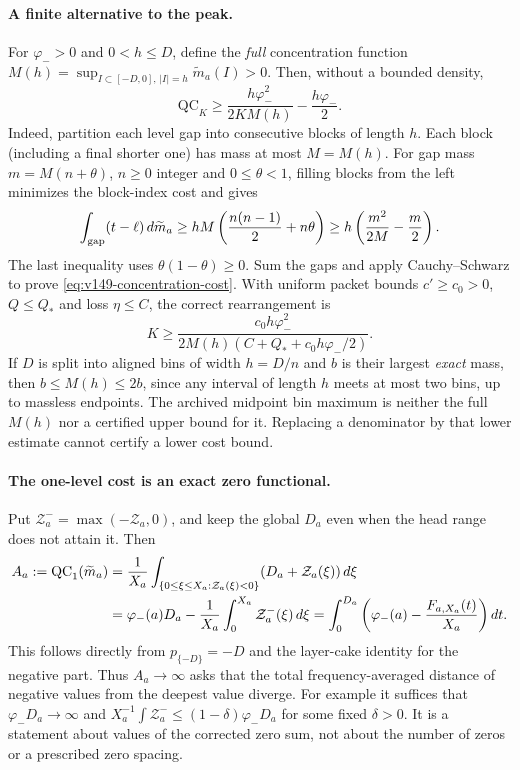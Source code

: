 \paragraph{A finite alternative to the peak.}
For $\varphi_->0$ and $0<h\le D$, define the \emph{full} concentration
function $M(h)=\sup_{I\subset[-D,0],\,|I|=h}\widetilde m_a(I)>0$.
Then, without a bounded density,
\begin{equation}\label{eq:v149-concentration-cost}
 \mathrm{QC}_K\ge\frac{h\varphi_-^2}{2KM(h)}-\frac{h\varphi_-}{2}.
\end{equation}
Indeed, partition each level gap into consecutive blocks of length $h$.
Each block (including a final shorter one) has mass at most $M=M(h)$.
For gap mass $m=M(n+\theta)$, $n\ge0$ integer and $0\le\theta<1$, filling
blocks from the left minimizes the block-index cost and gives
\[
 \int_{\rm gap}(t-\ell)\,d\widetilde m_a
 \ge hM\left(\frac{n(n-1)}2+n\theta\right)
 \ge h\left(\frac{m^2}{2M}-\frac m2\right).
\]
The last inequality uses $\theta(1-\theta)\ge0$. Sum the gaps and apply
Cauchy--Schwarz to prove \eqref{eq:v149-concentration-cost}.
With uniform packet bounds $c'\ge c_0>0$, $Q\le Q_*$ and loss $\eta\le C$,
the correct rearrangement is
\begin{equation}\label{eq:v149-concentration-rearrangement}
 K\ge\frac{c_0h\varphi_-^2}
 {2M(h)(C+Q_*+c_0h\varphi_-/2)}.
\end{equation}
If $D$ is split into aligned bins of width $h=D/n$ and $b$ is their
largest \emph{exact} mass, then $b\le M(h)\le2b$, since any interval
of length $h$ meets at most two bins, up to massless endpoints.
The archived midpoint bin maximum is neither the full $M(h)$ nor a
certified upper bound for it. Replacing a denominator by that lower
estimate cannot certify a lower cost bound.

\paragraph{The one-level cost is an exact zero functional.}
Put $\mathcal Z_a^-=\max(-\mathcal Z_a,0)$, and keep the global
$D_a$ even when the head range does not attain it. Then
\begin{align}
 A_a:=\mathrm{QC}_1(\widetilde m_a)
 &=\frac1{X_a}\int_{\{0\le\xi\le X_a:\mathcal Z_a(\xi)<0\}}
                         (D_a+\mathcal Z_a(\xi))\,d\xi \notag\\
 &=\varphi_-(a)D_a-\frac1{X_a}\int_0^{X_a}\mathcal Z_a^-(\xi)\,d\xi
 =\int_0^{D_a}\left(\varphi_-(a)-\frac{F_{a,X_a}(t)}{X_a}\right)dt.
 \label{eq:v149-qc1-zero}
\end{align}
This follows directly from $p_{\{-D\}}=-D$ and the layer-cake identity
for the negative part. Thus $A_a\to\infty$ asks that the total
frequency-averaged distance of negative values from the deepest
value diverge. For example it suffices that
$\varphi_-D_a\to\infty$ and
$X_a^{-1}\int\mathcal Z_a^-\le(1-\delta)\varphi_-D_a$ for some fixed
$\delta>0$. It is a statement about values of the corrected zero sum,
not about the number of zeros or a prescribed zero spacing.

